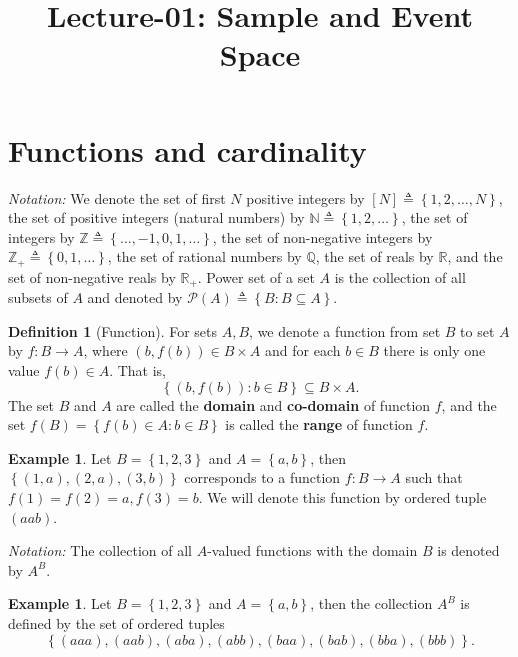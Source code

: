 \documentclass[letterpaper,10pt,english]{article}
\date{}
\title{Lecture-01: Sample and Event Space}
\author{}
\theoremstyle{plain}
\theoremstyle{definition}
\newtheorem{defn}[thm]{Definition}
\newtheorem{exmp}[thm]{Example}
\theoremstyle{remark}
\newcommand{\EQ}[1]{\begin{equation*}#1\end{equation*}}
\newcommand{\set}[1]{\left\{#1\right\}}
\newcommand{\N}{\mathbb{N}}
\newcommand{\Q}{\mathbb{Q}}
\newcommand{\R}{\mathbb{R}}
\newcommand{\Z}{\mathbb{Z}}
\newcommand{\cP}{\mathcal{P}}
\begin{document}
\maketitle

\section{Functions and cardinality} 

\emph{Notation:} 
We denote 
the set of first $N$ positive integers by $[N] \triangleq \set{1, 2, \dots, N}$, 
the set of positive integers (natural numbers) by $\N \triangleq \set{1, 2, \dots}$, 
the set of integers by $\Z \triangleq \set{\dots, -1, 0, 1, \dots}$, 
the set of non-negative integers by $\Z_+ \triangleq \set{0, 1, \dots}$, 
the set of rational numbers by $\Q$, %
the set of reals by $\R$, 
and the set of non-negative reals by $\R_+$. 
Power set of a set $A$ is the collection of all subsets of $A$ and denoted by $\cP(A) \triangleq \set{B: B \subseteq A}$. 
\begin{defn}[Function]
For sets $A, B$, we denote a function from set $B$ to set $A$ by $f: B \to A$,   
where $(b, f(b)) \in B \times A$ and for each $b \in B$ there is only one value $f(b) \in A$.  
That is, 
\EQ{
\set{(b, f(b)): b \in B} \subseteq B \times A. 
}
The set $B$ and $A$ are called the \textbf{domain} and \textbf{co-domain} of function $f$, 
and the set $f(B) = \set{f(b) \in A: b \in B}$ is called the \textbf{range} of function $f$. 
\end{defn}
\begin{shaded}
\begin{exmp}
Let $B = \set{1,2,3}$ and $A = \set{a,b}$, then $\set{(1,a), (2,a), (3,b)}$ corresponds to a function $f:B \to A$ such that $f(1)= f(2) = a, f(3) =b$. 
We will denote this function by ordered tuple $(aab)$.  
\end{exmp}
\end{shaded}
\emph{Notation:} The collection of all $A$-valued functions with the domain $B$ is denoted by $A^B$.   
\begin{shaded}
\begin{exmp}
Let $B = \set{1,2,3}$ and $A = \set{a,b}$, then the collection $A^B$ is defined by the set of ordered tuples 
\EQ{
\set{(aaa), (aab), (aba), (abb), (baa), (bab), (bba), (bbb)}.
}
\end{exmp}
\end{shaded}
\end{document}
